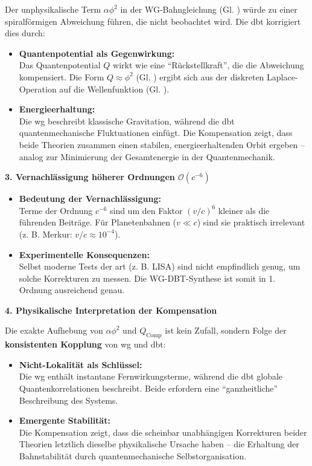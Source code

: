 Der unphysikalische Term $\alpha \phi^{2}$ in der WG-Bahngleichung (Gl. ) würde zu einer spiralförmigen Abweichung führen, die nicht beobachtet wird.
Die \gls{dbt} korrigiert dies durch:
\begin{itemize}
    \item \textbf{Quantenpotential als Gegenwirkung:}\\Das Quantenpotential $Q$ wirkt wie eine \enquote{Rückstellkraft}, die die Abweichung kompensiert. Die Form $Q \approx \phi^{2}$ (Gl. ) ergibt sich aus der diskreten Laplace-Operation auf die Wellenfunktion (Gl. ).
    \item \textbf{Energieerhaltung:}\\Die \gls{wg} beschreibt klassische Gravitation, während die \gls{dbt} quantenmechanische Fluktuationen einfügt. Die Kompensation zeigt, dass beide Theorien zusammen einen stabilen, energieerhaltenden Orbit ergeben – analog zur Minimierung der Gesamtenergie in der Quantenmechanik.
\end{itemize}

\textbf{3. Vernachlässigung höherer Ordnungen $\mathcal{O}(c^{-6})$}

\begin{itemize}
    \item \textbf{Bedeutung der Vernachlässigung:}\\Terme der Ordnung $c^{-6}$ sind um den Faktor $(v/c)^{6}$ kleiner als die führenden Beiträge. Für Planetenbahnen ($v \ll c$) sind sie praktisch irrelevant (z. B. Merkur: $v/c \approx 10^{-4}$).
    \item \textbf{Experimentelle Konsequenzen:}\\Selbst moderne Tests der \gls{art} (z. B. LISA) sind nicht empfindlich genug, um solche Korrekturen zu messen. Die WG-DBT-Synthese ist somit in 1. Ordnung ausreichend genau.
\end{itemize}

\textbf{4. Physikalische Interpretation der Kompensation}

Die exakte Aufhebung von $\alpha \phi^{2}$ und $Q_\text{Comp}$ ist kein Zufall, sondern Folge der \textbf{konsistenten Kopplung} von \gls{wg} und \gls{dbt}:
\begin{itemize}
    \item \textbf{Nicht-Lokalität als Schlüssel:}\\Die \gls{wg} enthält instantane Fernwirkungsterme, während die \gls{dbt} globale Quantenkorrelationen beschreibt. Beide erfordern eine \enquote{ganzheitliche} Beschreibung des Systems.
    \item \textbf{Emergente Stabilität:}\\Die Kompensation zeigt, dass die scheinbar unabhängigen Korrekturen beider Theorien letztlich dieselbe physikalische Ursache haben – die Erhaltung der Bahnstabilität durch quantenmechanische Selbstorganisation.
\end{itemize}

